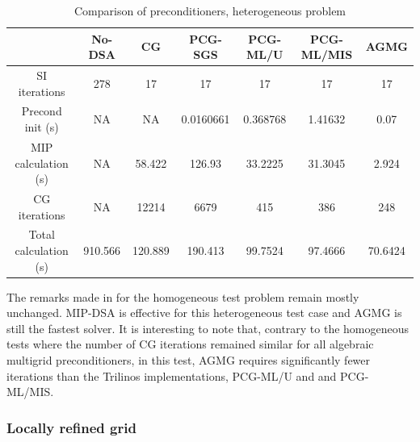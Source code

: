 %
%
\begin{table}[!htbp]
  \begin{center}
    \caption{Comparison of preconditioners, heterogeneous problem}
    \begin{tabular}{|c|c|c|c|c|c|c|}
      \hline
      & No-DSA & CG & PCG-SGS & PCG-ML/U & PCG-ML/MIS & AGMG\\
      \hline
      SI iterations & 278     & 17      & 17        & 17       & 17      & 17  \\
   Precond init (s) & NA      & NA      & 0.0160661 & 0.368768 & 1.41632 &
      0.07  \\
MIP calculation (s) & NA      & 58.422  & 126.93    & 33.2225  & 31.3045 &
      2.924 \\
      CG iterations & NA      & 12214   & 6679      & 415      & 386     & 248  \\
Total calculation (s) & 910.566 & 120.889 & 190.413 & 99.7524  & 97.4666 &
      70.6424 \\      
      \hline
    \end{tabular}
    \label{comparison_hex}
  \end{center}
\end{table}
%
The remarks made in  for the homogeneous test problem
remain mostly unchanged. MIP-DSA is effective for this heterogeneous test case and AGMG is
still the fastest solver. It is interesting to note that, contrary to the
homogeneous tests where the number of CG iterations remained similar for all
algebraic multigrid preconditioners, in this test, AGMG requires
significantly fewer iterations than the Trilinos implementations, PCG-ML/U and and PCG-ML/MIS.

\subsubsection{Locally refined grid}

